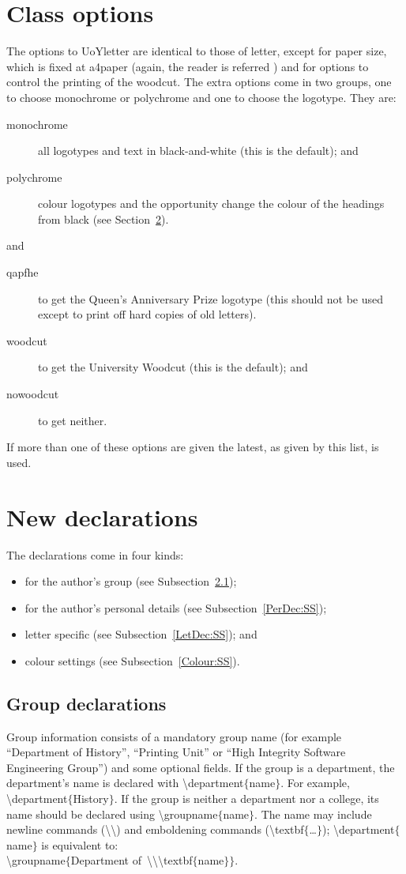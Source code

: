 \documentclass[12pt,a4paper]{article}
\newcommand{\cmdsty}[1]{\textsf{#1}}
\newcommand{\cmd}[1]{\cmdsty{\textbackslash#1}}
\newcommand{\pcmd}[2]{\cmdsty{\cmd{#1}$\{$#2$\}$}}
\newcommand{\nl}{\textbackslash\textbackslash}
\begin{document}
\section{Class options}\label{ClOpts:Sec}
The options to \cmdsty{UoYletter} are identical to those of
\cmdsty{letter}, except for paper size, which is fixed at
\cmdsty{a4paper} (again, the reader is referred
) and for options to control the printing of
the woodcut.  The extra options come in two groups, one to choose
monochrome or polychrome and one to choose the logotype.  They are:
\begin{description}
\item[\cmdsty{monochrome}] all logotypes and text in black-and-white
  (this is the default); and
\item[\cmdsty{polychrome}] colour logotypes and the opportunity change
  the colour of the headings from black (see
  Section~\ref{NewDec:Sec}).
\end{description}
and
\begin{description}
\item[\cmdsty{qapfhe}] to get the Queen's Anniversary Prize logotype
  (this should not be used except to print off hard copies of old
  letters).
\item[\cmdsty{woodcut}] to get the University Woodcut (this is the
  default); and
\item[\cmdsty{nowoodcut}] to get neither.
\end{description}
If more than one of these options are given the latest, as given by
this list, is used.

\section{New declarations}\label{NewDec:Sec}

The declarations come in four kinds:
\begin{itemize}
\item for the author's group (see Subsection~\ref{GrpDec:SS});
\item for the author's personal details (see
  Subsection~\ref{PerDec:SS});
\item letter specific (see Subsection~\ref{LetDec:SS}); and
\item colour settings (see Subsection~\ref{Colour:SS}).
\end{itemize}
\subsection{Group declarations}\label{GrpDec:SS}
Group information consists of a mandatory group name (for example
``Department of History'', ``Printing Unit'' or ``High Integrity
Software Engineering Group'') and some optional fields.
If the group is a department, the department's name is declared with
\pcmd{department}{name}.  For example, \pcmd{department}{History}.
If the group is neither a department nor a college, its name should be
declared using \pcmd{groupname}{name}.  The \cmdsty{name} may include
newline commands (\nl) and emboldening commands
(\pcmd{textbf}{\ldots}); \pcmd{department}{name} is equivalent to:\\
\pcmd{groupname}{Department of\ \nl \pcmd{textbf}{name}}.
\end{document}
